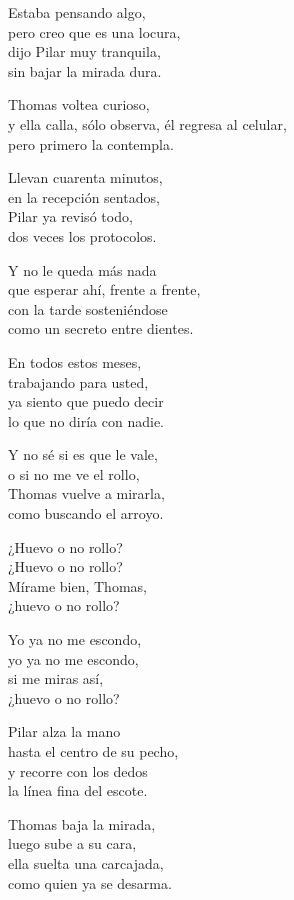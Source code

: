 \begin{lyrics}
Estaba pensando algo,\\
pero creo que es una locura,\\
dijo Pilar muy tranquila,\\
sin bajar la mirada dura.

Thomas voltea curioso,\\
y ella calla, sólo observa,
él regresa al celular,\\
pero primero la contempla.

Llevan cuarenta minutos,\\
en la recepción sentados,\\
Pilar ya revisó todo,\\
dos veces los protocolos.

Y no le queda más nada\\
que esperar ahí, frente a frente,\\
con la tarde sosteniéndose\\
como un secreto entre dientes.

En todos estos meses,\\
trabajando para usted,\\
ya siento que puedo decir\\
lo que no diría con nadie.

Y no sé si es que le vale,\\
o si no me ve el rollo,\\
Thomas vuelve a mirarla,\\
como buscando el arroyo.

¿Huevo o no rollo?\\
¿Huevo o no rollo?\\
Mírame bien, Thomas,\\
¿huevo o no rollo?

Yo ya no me escondo,\\
yo ya no me escondo,\\
si me miras así,\\
¿huevo o no rollo?

Pilar alza la mano\\
hasta el centro de su pecho,\\
y recorre con los dedos\\
la línea fina del escote.

Thomas baja la mirada,\\
luego sube a su cara,\\
ella suelta una carcajada,\\
como quien ya se desarma.


\end{lyrics}
